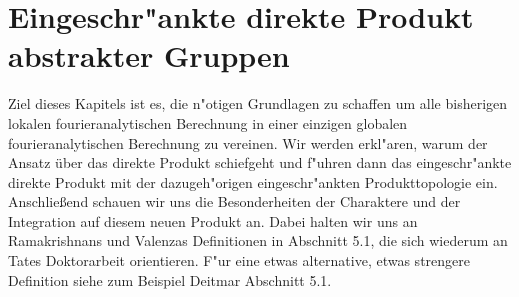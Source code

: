 \section{Eingeschr"ankte direkte Produkt abstrakter Gruppen}\label{sec:rdp}
	Ziel dieses Kapitels ist es, die n"otigen Grundlagen zu schaffen um alle bisherigen lokalen fourieranalytischen Berechnung in einer einzigen globalen fourieranalytischen Berechnung zu vereinen. 
	Wir werden erkl"aren, warum der Ansatz über das direkte Produkt schiefgeht und f"uhren dann das eingeschr"ankte direkte Produkt mit der dazugeh"origen eingeschr"ankten Produkttopologie ein.
	Anschließend schauen wir uns die Besonderheiten der Charaktere und der Integration auf diesem neuen Produkt an. 
	Dabei halten wir uns an Ramakrishnans und Valenzas Definitionen in \cite{rama} Abschnitt 5.1, die sich wiederum an Tates Doktorarbeit \cite{tate} orientieren.
	F"ur eine etwas alternative, etwas strengere Definition siehe zum Beispiel Deitmar \cite{deitmar2010} Abschnitt 5.1.
